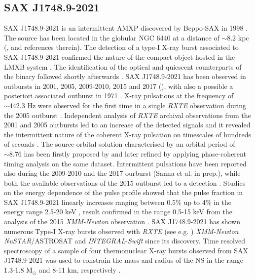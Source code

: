 \documentclass[graybox]{svmult}
\def \inte {{\em INTEGRAL\xspace}}
\def \swift {{\em Swift\xspace}}
\def \xmm {{\em XMM-Newton\xspace}}
\def \rxte {{\em RXTE\xspace}}
\def \nustar{{\em NuSTAR\xspace}}
\begin{document}
\subsection{SAX J1748.9-2021}
SAX J1748.9-2021 is an intermittent AMXP discovered by Beppo-SAX in 1998 \cite{intZand1998}. The source has been located in the globular
NGC 6440 at a distance of $\sim8.2$ kpc (\cite{intZand1999,Valenti2007}, and references therein). The detection of a type-I X-ray burst associated to SAX J1748.9-2021 confirmed the nature of the compact object hosted in the LMXB system \cite{intZand2001a}. The identification of the optical and quiescent counterparts of the binary followed shortly afterwards \cite{intZand2001b}. SAX J1748.9-2021 has been observed in outbursts in 2001, 2005, 2009-2010, 2015 and 2017 (\cite{intZand1999,Verbunt2000,intZand2001a,Markwardt2005,Patruno2009,Pintore2016,Sanna2016,Pintore2018}), with also a possible a posteriori associated outburst in 1971 \cite{Markert1975}.  
X-ray pulsations at the frequency of $\sim442.3$ Hz were observed for the first time in a single \rxte{} observation during the 2005 outburst \cite{Gavriil2007}. Independent analysis of \rxte{} archival observations from the 2001 and 2005 outbursts led to an increase of the detected signals and it revealed the intermittent nature of the coherent X-ray pulsation on timescales of hundreds of seconds \cite{Altamirano2008,Patruno2010d}. The source orbital solution characterised by an orbital period of $\sim8.76$ has been firstly proposed by \cite{Altamirano2008} and later refined by \cite{Patruno2009} applying phase-coherent timing analysis on the same dataset. Intermittent pulsations have been reported also during the 2009-2010 \cite{Patruno2010d} and the 2017 ourburst (Sanna et al. in prep.), while both the available observations of the 2015 outburst led to a detection \cite{Sanna2016}. Studies on the energy dependence of the pulse profile showed that the pulse fraction in SAX J1748.9-2021 linearly increases ranging between 0.5\% up to 4\% in the energy range 2.5-20 keV \cite{Patruno2009}, result confirmed in the range 0.5-15 keV from the analysis of the 2015 \xmm{} observation \cite{Sanna2016}.
SAX J1748.9-2021 has shown numerous Type-I X-ray bursts observed with \rxte{} (see e.g. \cite{Galloway2008b}) \xmm{} \cite{Pintore2016,Pintore2018} \nustar{}/ASTROSAT \cite{Sharma2019} and \inte{}-\swift{} \cite{Li2018} since its discovery. Time resolved spectroscopy of a sample of four thermonuclear X-ray bursts observed from SAX J1748.9-2021 was used to constrain the mass and radius of the NS in the range 1.3-1.8 M$_\odot$ and 8-11 km, respectively \cite{Guver2013}. 
\end{document}
